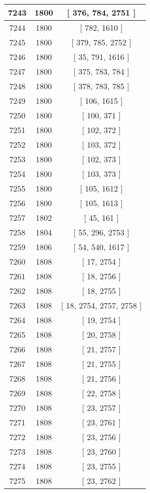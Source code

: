 \begin{center}
\begin{longtable}[H]{|| c c c ||}
\hline
7243 & 1800 & [ 376, 784, 2751 ] \\ 
\hline
7244 & 1800 & [ 782, 1610 ] \\ 
\hline
7245 & 1800 & [ 379, 785, 2752 ] \\ 
\hline
7246 & 1800 & [ 35, 791, 1616 ] \\ 
\hline
7247 & 1800 & [ 375, 783, 784 ] \\ 
\hline
7248 & 1800 & [ 378, 783, 785 ] \\ 
\hline
7249 & 1800 & [ 106, 1615 ] \\ 
\hline
7250 & 1800 & [ 100, 371 ] \\ 
\hline
7251 & 1800 & [ 102, 372 ] \\ 
\hline
7252 & 1800 & [ 103, 372 ] \\ 
\hline
7253 & 1800 & [ 102, 373 ] \\ 
\hline
7254 & 1800 & [ 103, 373 ] \\ 
\hline
7255 & 1800 & [ 105, 1612 ] \\ 
\hline
7256 & 1800 & [ 105, 1613 ] \\ 
\hline
7257 & 1802 & [ 45, 161 ] \\ 
\hline
7258 & 1804 & [ 55, 296, 2753 ] \\ 
\hline
7259 & 1806 & [ 54, 540, 1617 ] \\ 
\hline
7260 & 1808 & [ 17, 2754 ] \\ 
\hline
7261 & 1808 & [ 18, 2756 ] \\ 
\hline
7262 & 1808 & [ 18, 2755 ] \\ 
\hline
7263 & 1808 & [ 18, 2754, 2757, 2758 ] \\ 
\hline
7264 & 1808 & [ 19, 2754 ] \\ 
\hline
7265 & 1808 & [ 20, 2758 ] \\ 
\hline
7266 & 1808 & [ 21, 2757 ] \\ 
\hline
7267 & 1808 & [ 21, 2755 ] \\ 
\hline
7268 & 1808 & [ 21, 2756 ] \\ 
\hline
7269 & 1808 & [ 22, 2758 ] \\ 
\hline
7270 & 1808 & [ 23, 2757 ] \\ 
\hline
7271 & 1808 & [ 23, 2761 ] \\ 
\hline
7272 & 1808 & [ 23, 2756 ] \\ 
\hline
7273 & 1808 & [ 23, 2760 ] \\ 
\hline
7274 & 1808 & [ 23, 2755 ] \\ 
\hline
7275 & 1808 & [ 23, 2762 ] \\ 

\end{longtable}
\end{center}
